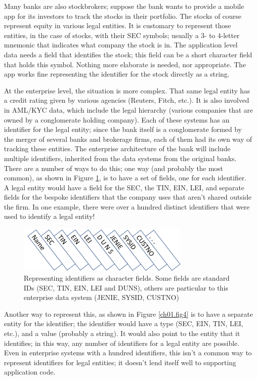 Many banks are also stockbrokers; suppose the bank wants to provide a mobile app for its investors to track the stocks in their portfolio.  The stocks of course represent equity in various legal entities.  It is customary to represent those entities, in the case of stocks, with their SEC symbols; usually a 3- to 4-letter mnemonic that indicates what company the stock is in.  The application level data needs a field that identifies the stock; this field can be a short character field that holds this symbol.  Nothing more elaborate is needed, nor appropriate.  The app works fine representing the identifier for the stock directly as a string. 

At the enterprise level, the situation is more complex.  That same legal entity has a credit rating given by various agencies (Reuters, Fitch, etc.).  It is also involved in AML/KYC data, which include the legal hierarchy (various companies that are owned by a conglomerate holding company).  Each of these systems has an identifier for the legal entity; since the bank itself is a conglomerate formed by the merger of several banks and brokerage firms, each of them had its own way of tracking these entities.  The enterprise architecture of the bank will include multiple identifiers, inherited from the data systems from the original banks.  There are a number of ways to do this; one way (and probably the most common), as shown in Figure \ref{ch01.fig3}, is to have a set of fields, one  for each identifier.  A legal entity would have a field for the SEC, the TIN, EIN, LEI, and separate fields for the bespoke identifiers that the company uses that aren't shared outside the firm.  In one example, there were over a hundred distinct identifiers that were used to identify a legal entity!  

\begin{figure}[hbt] %
\centering
  \includegraphics[width=3.3in]{figures/id-table.jpg}
\caption{Representing identifiers as character fields.  Some fields are standard IDs (SEC, TIN, EIN, LEI and DUNS), others are particular to this enterprise data system (JENIE, SYSID, CUSTNO) }
\label{ch01.fig3} 
\end{figure}

Another way to represent this, as shown in Figure \ref{ch01.fig4} is to have a separate entity for the identifier;  the identifier would have a type (SEC, EIN, TIN, LEI, etc.), and a value (probably a string).  It would also point to the entity that it identifies; in this way, any number of identifiers for a legal entity are possible.  Even in enterprise systems with a hundred identifiers, this isn't a common way to represent identifiers for legal entities; it doesn't lend itself well to supporting application code.  

